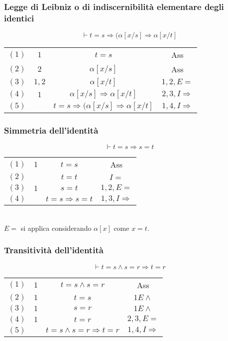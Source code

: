 \subsubsection{Legge di Leibniz o di indiscernibilit\`a elementare degli identici}
\begin{equation}
\vdash t=s\Rightarrow(\alpha[x/s]\Rightarrow\alpha[x/t]
\end{equation}
\begin{tabular}{c c c c}
$(1)$  & $1$ & $t=s$ & Ass \\
$(2)$  & $2$ & $\alpha[x/s]$ & Ass \\
$(3)$  & $1, 2$ & $\alpha[x/t]$ & $1,2, E=$ \\
$(4)$  & $1$ & $\alpha[x/s]\Rightarrow\alpha[x/t]$ & $2, 3, I\Rightarrow$ \\
$(5)$  &  & $t=s\Rightarrow(\alpha[x/s]\Rightarrow\alpha[x/t]$ & $1, 4, I\Rightarrow$ \\
\end{tabular}
\subsubsection{Simmetria dell'identit\`a}
\begin{equation}
\vdash t=s\Rightarrow s=t
\end{equation}
\begin{tabular}{c c c c}
$(1)$  & $1$ & $t=s$ & Ass \\
$(2)$  &  & $t=t$ &  $I=$\\
$(3)$  & $1$ & $s=t$ & $1, 2, E=$ \\
$(4)$  &  & $t=s\Rightarrow s=t$ &  $1, 3, I\Rightarrow$\\
\end{tabular}\\
$E=$ si applica considerando $\alpha[x]$ come $x=t$.
\subsubsection{Transitivit\`a dell'identit\`a}
\begin{equation}
\vdash t=s\land s=r\Rightarrow t=r
\end{equation}
\begin{tabular}{c c c c}
$(1)$  & $1$ & $t=s\land s=r$ &  Ass\\
$(2)$  & $1$ & $t=s$ & $1 E\land$ \\
$(3)$  & $1$ & $s=r$ & $1 E\land$ \\
$(4)$  & $1$ & $t=r$ & $2, 3, E=$ \\
$(5)$  &  & $t=s\land s=r\Rightarrow t=r$ & $1, 4, I\Rightarrow$ \\
\end{tabular}









